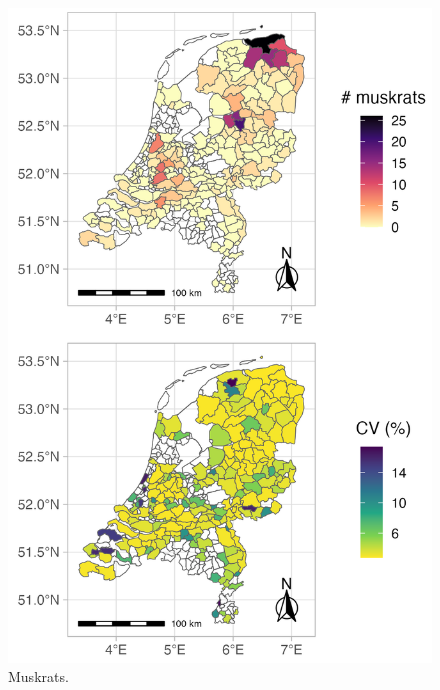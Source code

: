 \documentclass[
  11pt,
  a4paper,
]{article}
\begin{document}
\begin{figure}[b]

{\centering \includegraphics[width=0.95\linewidth]{muskrats} 

}

\caption{Muskrats.}\label{fig:muskrats}
\end{figure}
\end{document}
